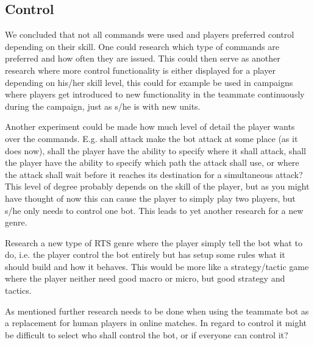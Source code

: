 \subsection{Control}
\label{sec:future_control}
We concluded that not all commands were used and players preferred control depending on their skill.
One could research which type of commands are preferred and how often they are issued. This could
then serve as another research where more control functionality is either displayed for a player
depending on his/her skill level, this could for example be used in campaigns where players get
introduced to new functionality in the teammate continuously during the campaign, just as s/he is
with new units.

Another experiment could be made how much level of detail the player wants over the commands. E.g.
shall attack make the bot attack at some place (as it does now), shall the player have the ability
to specify where it shall attack, shall the player have the ability to specify which path the attack
shall use, or where the attack shall wait before it reaches its destination for a simultaneous
attack?  This level of degree probably depends on the skill of the player, but as you might have
thought of now this can cause the player to simply play two players, but s/he only needs to control
one bot. This leads to yet another research for a new genre.

Research a new type of RTS genre where the player simply tell the bot what to do, i.e. the player
control the bot entirely but has setup some rules what it should build and how it behaves. This
would be more like a strategy/tactic game where the player neither need good macro or micro, but
good strategy and tactics.

As mentioned further research needs to be done when using the teammate bot as a replacement for
human players in online matches. In regard to control it might be difficult to select who shall
control the bot, or if everyone can control it?
